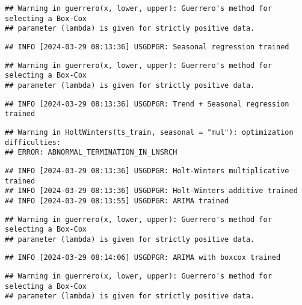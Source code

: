 \documentclass[
]{article}
\begin{document}
\begin{verbatim}
## Warning in guerrero(x, lower, upper): Guerrero's method for selecting a Box-Cox
## parameter (lambda) is given for strictly positive data.
\end{verbatim}

\begin{verbatim}
## INFO [2024-03-29 08:13:36] USGDPGR: Seasonal regression trained
\end{verbatim}

\begin{verbatim}
## Warning in guerrero(x, lower, upper): Guerrero's method for selecting a Box-Cox
## parameter (lambda) is given for strictly positive data.
\end{verbatim}

\begin{verbatim}
## INFO [2024-03-29 08:13:36] USGDPGR: Trend + Seasonal regression trained
\end{verbatim}

\begin{verbatim}
## Warning in HoltWinters(ts_train, seasonal = "mul"): optimization difficulties:
## ERROR: ABNORMAL_TERMINATION_IN_LNSRCH
\end{verbatim}

\begin{verbatim}
## INFO [2024-03-29 08:13:36] USGDPGR: Holt-Winters multiplicative trained
## INFO [2024-03-29 08:13:36] USGDPGR: Holt-Winters additive trained
## INFO [2024-03-29 08:13:55] USGDPGR: ARIMA trained
\end{verbatim}

\begin{verbatim}
## Warning in guerrero(x, lower, upper): Guerrero's method for selecting a Box-Cox
## parameter (lambda) is given for strictly positive data.
\end{verbatim}

\begin{verbatim}
## INFO [2024-03-29 08:14:06] USGDPGR: ARIMA with boxcox trained
\end{verbatim}

\begin{verbatim}
## Warning in guerrero(x, lower, upper): Guerrero's method for selecting a Box-Cox
## parameter (lambda) is given for strictly positive data.
\end{verbatim}
\end{document}
